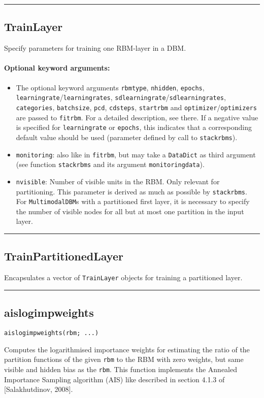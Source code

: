 \noindent\rule{\textwidth}{1pt}
\subsection*{TrainLayer}
Specify parameters for training one RBM-layer in a DBM.

\paragraph*{Optional keyword arguments:}
\begin{itemize}
\item The optional keyword arguments \texttt{rbmtype}, \texttt{nhidden}, \texttt{epochs}, \texttt{learningrate}/\texttt{learningrates}, \texttt{sdlearningrate}/\texttt{sdlearningrates}, \texttt{categories}, \texttt{batchsize}, \texttt{pcd}, \texttt{cdsteps}, \texttt{startrbm} and \texttt{optimizer}/\texttt{optimizers} are passed to \texttt{fitrbm}. For a detailed description, see there. If a negative value is specified for \texttt{learningrate} or \texttt{epochs}, this indicates that a corresponding default value should be used (parameter defined by call to \texttt{stackrbms}).


\item \texttt{monitoring}: also like in \texttt{fitrbm}, but may take a \texttt{DataDict} as third argument  (see function \texttt{stackrbms} and its argument \texttt{monitoringdata}).


\item \texttt{nvisible}: Number of visible units in the RBM. Only relevant for partitioning.  This parameter is derived as much as possible by \texttt{stackrbms}.  For \texttt{MultimodalDBM}s with a partitioned first layer, it is necessary to specify  the number of visible nodes for all but at most one partition in the input layer.

\end{itemize}
\noindent\rule{\textwidth}{1pt}
\subsection*{TrainPartitionedLayer}
Encapsulates a vector of \texttt{TrainLayer} objects for training a partitioned layer.

\noindent\rule{\textwidth}{1pt}
\subsection*{aislogimpweights}
\begin{verbatim}
aislogimpweights(rbm; ...)
\end{verbatim}
Computes the logarithmised importance weights for estimating the ratio of the partition functions of the given \texttt{rbm} to the RBM with zero weights, but same visible and hidden bias as the \texttt{rbm}. This function implements the Annealed Importance Sampling algorithm (AIS) like described in section 4.1.3 of [Salakhutdinov, 2008].

